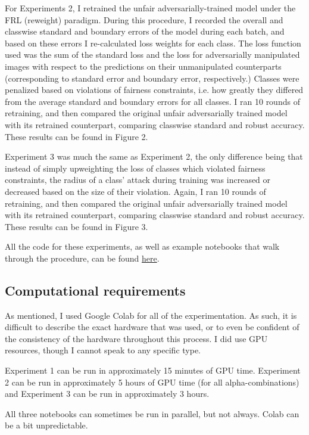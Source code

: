 For Experiments 2, I retrained the unfair adversarially-trained model under the FRL (reweight) paradigm. During this procedure, I recorded the overall and classwise standard and boundary errors of the model during each batch, and based on these errors I re-calculated loss weights for each class. The loss function used was the sum of the standard loss and the loss for adversarially manipulated images with respect to the predictions on their unmanipulated counterparts (corresponding to standard error and boundary error, respectively.) Classes were penalized based on violations of fairness constraints, i.e. how greatly they differed from the average standard and boundary errors for all classes. I ran 10 rounds of retraining, and then compared the original unfair adversarially trained model with its retrained counterpart, comparing classwise standard and robust accuracy. These results can be found in Figure 2. 

Experiment 3 was much the same as Experiment 2, the only difference being that instead of simply upweighting the loss of classes which violated fairness constraints, the radius of a class' attack during training was increased or decreased based on the size of their violation. Again, I ran 10 rounds of retraining, and then compared the original unfair adversarially trained model with its retrained counterpart, comparing classwise standard and robust accuracy. These results can be found in Figure 3. 

All the code for these experiments, as well as example notebooks that walk through the procedure, can be found \href{https://github.com/Ian-Hardy/Fair_Robust_Modeling}{here}. 

\subsection{Computational requirements}
As mentioned, I used Google Colab for all of the experimentation. As such, it is difficult to describe the exact hardware that was used, or to even be confident of the consistency of the hardware throughout this process. I did use GPU resources, though I cannot speak to any specific type. 

Experiment 1 can be run in approximately 15 minutes of GPU time. Experiment 2 can be run in approximately 5 hours of GPU time (for all alpha-combinations) and Experiment 3 can be run in approximately 3 hours. 

All three notebooks can sometimes be run in parallel, but not always. Colab can be a bit unpredictable. 

